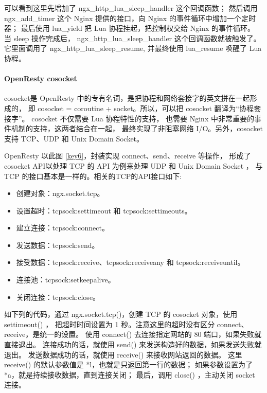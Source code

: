 \documentclass[a4,10pt]{ctexart}
\begin{document}
可以看到这里先增加了 ngx\_http\_lua\_sleep\_handler 这个回调函数；
然后调用 ngx\_add\_timer 这个 Nginx 提供的接口，向 Nginx 的事件循环中增加一个定时器；
最后使用 lua\_yield 把 Lua 协程挂起，把控制权交给 Nginx 的事件循环。
当 sleep 操作完成后， ngx\_http\_lua\_sleep\_handler 这个回调函数就被触发了。
它里面调用了 ngx\_http\_lua\_sleep\_resume, 并最终使用 lua\_resume 唤醒了 Lua 协程。

\paragraph{OpenResty cosocket}

cosocket是 OpenResty 中的专有名词，是把协程和网络套接字的英文拼在一起形成的，
即 cosocket = coroutine + socket。所以，可以把 cosocket 翻译为“协程套接字”。
cosocket 不仅需要 Lua 协程特性的支持，
也需要 Nginx 中非常重要的事件机制的支持，这两者结合在一起，
最终实现了非阻塞网络 I/O。另外，cosocket 支持 TCP、UDP 和 Unix Domain Socket。

OpenResty 以此图 \ref{key6}，封装实现 connect、send、receive 等操作，
形成了 cosocket API以处理 TCP 的 API 为例来处理 UDP 和 Unix Domain Socket ，
与TCP 的接口基本是一样的。相关的TCP的API接口如下:

\begin{itemize}[noitemsep]
	\item 创建对象：ngx.socket.tcp。
	\item 设置超时：tcpsock:settimeout 和 tcpsock:settimeouts。
	\item 建立连接：tcpsock:connect。
	\item 发送数据：tcpsock:send。
	\item 接受数据：tcpsock:receive、tcpsock:receiveany 和 tcpsock:receiveuntil。
	\item 连接池：tcpsock:setkeepalive。
	\item 关闭连接：tcpsock:close。
\end{itemize}

如下列的代码，通过 ngx.socket.tcp()，创建 TCP 的 cosocket 对象，使用 settimeout() ，
把超时时间设置为 1 秒。注意这里的超时没有区分 connect、receive，是统一的设置。
使用 connect() 去连接指定网站的 80 端口，如果失败就直接退出。
连接成功的话，就使用 send() 来发送构造好的数据，如果发送失败就退出。
发送数据成功的话，就使用 receive() 来接收网站返回的数据。
这里 receive() 的默认参数值是 *l，也就是只返回第一行的数据；
如果参数设置为了*a，就是持续接收数据，直到连接关闭；
最后，调用 close() ，主动关闭 socket 连接。
\end{document}
